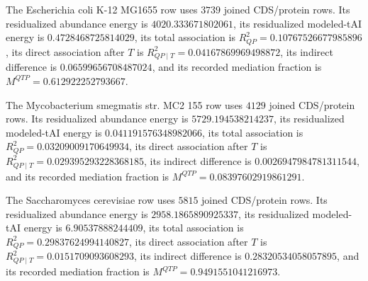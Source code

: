 \begin{definition}
\label{def:bioreality-q-six-translation-mediation-organism-rows}
The Escherichia coli K-12 MG1655 row uses $3739$ joined CDS/protein rows. Its residualized abundance energy is $4020.333671802061$, its residualized modeled-tAI energy is $0.4728468725814029$, its total association is $R^2_{QP}=0.10767526677985896$, its direct association after $T$ is $R^2_{QP\mid T}=0.04167869969498872$, its indirect difference is $0.06599656708487024$, and its recorded mediation fraction is $M^{QTP}=0.612922252793667$.

The Mycobacterium smegmatis str. MC2 155 row uses $4129$ joined CDS/protein rows. Its residualized abundance energy is $5729.194538214237$, its residualized modeled-tAI energy is $0.041191576348982066$, its total association is $R^2_{QP}=0.03209009170649934$, its direct association after $T$ is $R^2_{QP\mid T}=0.029395293228368185$, its indirect difference is $0.0026947984781311544$, and its recorded mediation fraction is $M^{QTP}=0.08397602919861291$.

The Saccharomyces cerevisiae row uses $5815$ joined CDS/protein rows. Its residualized abundance energy is $2958.1865890925337$, its residualized modeled-tAI energy is $6.90537888244409$, its total association is $R^2_{QP}=0.29837624994140827$, its direct association after $T$ is $R^2_{QP\mid T}=0.0151709093608293$, its indirect difference is $0.28320534058057895$, and its recorded mediation fraction is $M^{QTP}=0.9491551041216973$.
\end{definition}

